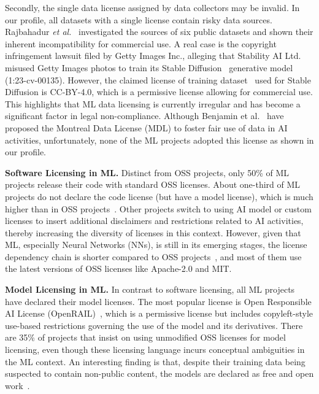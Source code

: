 Secondly, the single data license assigned by data collectors may be invalid.
In our profile, all datasets with a single license contain risky data sources.
Rajbahadur \textit{et al.}~\cite{rajbahadur2021can} investigated the sources of six public datasets and shown their inherent incompatibility for commercial use.
A real case is the copyright infringement lawsuit filed by Getty Images Inc., alleging that Stability AI Ltd. misused Getty Images photos to train its Stable Diffusion~\cite{rombach2022high} generative model (1:23-cv-00135).
However, the claimed license of training dataset~\cite{schuhmann2022laion} used for Stable Diffusion is CC-BY-4.0, which is a permissive license allowing for commercial use.
This highlights that ML data licensing is currently irregular and has become a significant factor in legal non-compliance.
Although Benjamin et al.~\cite{benjamin2019towards} have proposed the Montreal Data License (MDL) to foster fair use of data in AI activities, unfortunately, none of the ML projects adopted this license as shown in our profile.

\textbf{Software Licensing in ML.}
Distinct from OSS projects, only 50\% of ML projects release their code with standard OSS licenses.
About one-third of ML projects do not declare the code license (but have a model license), which is much higher than in OSS projects~\cite{cui2023empirical}.
Other projects switch to using AI model or custom licenses to insert additional disclaimers and restrictions related to AI activities, thereby increasing the diversity of licenses in this context.
However, given that ML, especially Neural Networks (NNs), is still in its emerging stages, the license dependency chain is shorter compared to OSS projects~\cite{buchkova2022dasea}, and most of them use the latest versions of OSS licenses like Apache-2.0 and MIT.


\textbf{Model Licensing in ML.}
In contrast to software licensing, all ML projects have declared their model licenses.
The most popular license is Open Responsible AI License (OpenRAIL)~\cite{contractor2022behavioral}, which is a permissive license but includes copyleft-style use-based restrictions governing the use of the model and its derivatives.
There are 35\% of projects that insist on using unmodified OSS licenses for model licensing, even though these licensing language incurs conceptual ambiguities in the ML context.
An interesting finding is that, despite their training data being suspected to contain non-public content, the models are declared as free and open work~\cite{henderson2023foundation}.

